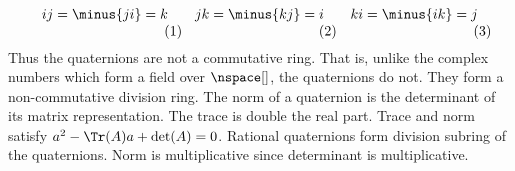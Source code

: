 \documentclass{book}                                                           %
\begin{document}
            \par
            \begin{subequations}
                \begin{minipage}[b]{0.32\textwidth}
                    \centering
                    \begin{equation}
                        ij=\minus{ji}=k
                    \end{equation}
                \end{minipage}
                \hfill
                \begin{minipage}[b]{0.32\textwidth}
                    \centering
                    \begin{equation}
                        jk=\minus{kj}=i
                    \end{equation}
                \end{minipage}
                \hfill
                \begin{minipage}[b]{0.32\textwidth}
                    \centering
                    \begin{equation}
                        ki=\minus{ik}=j
                    \end{equation}
                \end{minipage}
            \end{subequations}
            Thus the quaternions are not a commutative ring. That is, unlike
            the complex numbers which form a field over $\nspace[]$, the
            quaternions do not. They form a non-commutative division ring.
            The norm of a quaternion is the determinant of its matrix
            representation. The trace is double the real part. Trace and
            norm satisfy $a^{2}-\Tr(A)a+\det(A)=0$. Rational quaternions
            form division subring of the quaternions. Norm is multiplicative
            since determinant is multiplicative.
\end{document}
